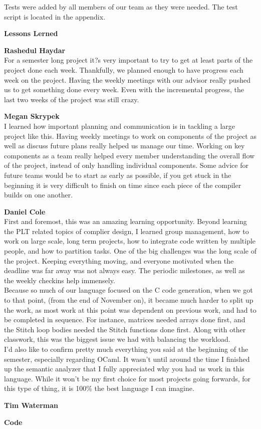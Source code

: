 \documentclass[11pt, oneside]{article}   	%
\newcommand{\tab} {\hspace*{2em}}
\begin{document}
Tests were added by all members of our team as they were needed. The test script is located in the appendix.


\newpage
\LARGE\textbf{Lessons Lerned}\\[2em]
\normalsize

\Large\textbf{Rashedul Haydar}\\[1em]
\normalsize
\tab For a semester long project it?s very important to try to get at least parts of the project done each week. Thankfully, we planned enough to have progress each week on the project. Having the weekly meetings with our advisor really pushed us to get something done every week. Even with the incremental progress, the last two weeks of the project was still crazy. 

\newpage
\Large\textbf{Megan Skrypek}\\[1em]
\normalsize
\tab I learned how important planning and communication is in tackling a large project like this. Having weekly meetings to work on components of the project as well as discuss future plans really helped us manage our time. Working on key components as a team really helped every member understanding the overall flow of the project, instead of only handling individual components. Some advice for future teams would be to start as early as possible, if you get stuck in the beginning it is very difficult to finish on time since each piece of the compiler builds on one another.

\newpage
\Large\textbf{Daniel Cole}\\[1em]
\normalsize
\tab First and foremost, this was an amazing learning opportunity.  Beyond learning the PLT related topics of complier design, I learned group management, how to work on large scale, long term projects, how to integrate code written by multiple people, and how to partition tasks.  One of the big challenges was the long scale of the project.  Keeping everything moving, and everyone motivated when the deadline was far away was not always easy.  The periodic milestones, as well as the weekly checkins help immensely.\\[.5em]
\tab Because so much of our language focused on the C code generation, when we got to that point, (from the end of November on), it became much harder to split up the work, as most work at this point was dependent on previous work, and had to be completed in sequence.  For instance, matrices needed arrays done first, and the Stitch loop bodies needed the Stitch functions done first.  Along with other classwork, this was the biggest issue we had with balancing the workload.\\[.5em]
\tab I'd also like to confirm pretty much everything you said at the beginning of the semester, especially regarding OCaml.  It wasn't until around the time I finished up the semantic analyzer that I fully appreciated why you had us work in this language.  While it won't be my first choice for most projects going forwards, for this type of thing, it is 100\% the best language I can imagine.

\newpage
\Large\textbf{Tim Waterman}\\[1em]
\normalsize
\newpage

\newpage
\LARGE\textbf{Code}\\[2em]
\normalsize
\end{document}
